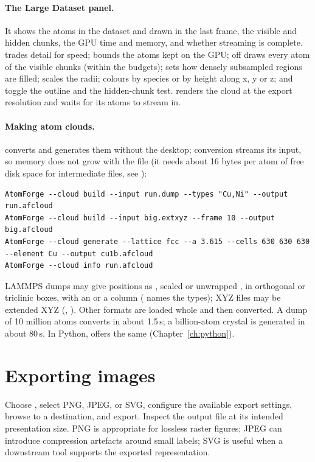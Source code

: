 \paragraph{The Large Dataset panel.} It shows the atoms in the dataset and drawn in the last frame, the visible and hidden chunks, the GPU time and memory, and whether streaming is complete.  trades detail for speed;  bounds the atoms kept on the GPU;  off draws every atom of the visible chunks (within the budgets);  sets how densely subsampled regions are filled;  scales the radii;  colours by species or by height along x, y or z;  and  toggle the outline and the hidden-chunk test.  renders the cloud at the export resolution and waits for its atoms to stream in.

\paragraph{Making atom clouds.}  converts and generates them without the desktop; conversion streams its input, so memory does not grow with the file (it needs about 16 bytes per atom of free disk space for intermediate files, see ):
\begin{lstlisting}
AtomForge --cloud build --input run.dump --types "Cu,Ni" --output run.afcloud
AtomForge --cloud build --input big.extxyz --frame 10 --output big.afcloud
AtomForge --cloud generate --lattice fcc --a 3.615 --cells 630 630 630 --element Cu --output cu1b.afcloud
AtomForge --cloud info run.afcloud
\end{lstlisting}
LAMMPS dumps may give positions as , scaled  or unwrapped , in orthogonal or triclinic boxes, with an  or a  column ( names the types); XYZ files may be extended XYZ (, ). Other formats are loaded whole and then converted. A dump of 10 million atoms converts in about 1.5\,s; a billion-atom crystal is generated in about 80\,s. In Python,  offers the same (Chapter~\ref{ch:python}).

\section{Exporting images}
Choose , select PNG, JPEG, or SVG, configure the available export settings, browse to a destination, and export. Inspect the output file at its intended presentation size. PNG is appropriate for lossless raster figures; JPEG can introduce compression artefacts around small labels; SVG is useful when a downstream tool supports the exported representation.

